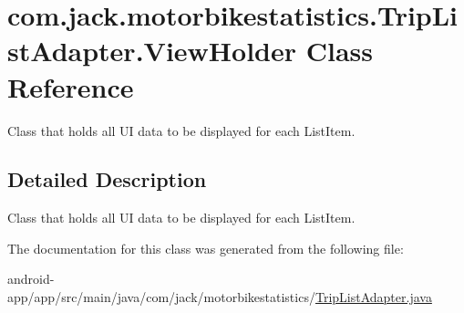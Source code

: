 \hypertarget{classcom_1_1jack_1_1motorbikestatistics_1_1_trip_list_adapter_1_1_view_holder}{}\section{com.\+jack.\+motorbikestatistics.\+Trip\+List\+Adapter.\+View\+Holder Class Reference}
\label{classcom_1_1jack_1_1motorbikestatistics_1_1_trip_list_adapter_1_1_view_holder}


Class that holds all UI data to be displayed for each List\+Item.  




\subsection{Detailed Description}
Class that holds all UI data to be displayed for each List\+Item. 

The documentation for this class was generated from the following file\+:\begin{DoxyCompactItemize}
\item 
android-\/app/app/src/main/java/com/jack/motorbikestatistics/\hyperlink{_trip_list_adapter_8java}{Trip\+List\+Adapter.\+java}\end{DoxyCompactItemize}
